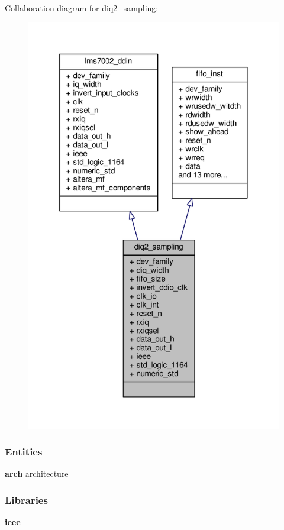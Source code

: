 Collaboration diagram for diq2\+\_\+sampling\+:\nopagebreak
\begin{figure}[H]
\begin{center}
\leavevmode
\includegraphics[width=320pt]{d4/d94/classdiq2__sampling__coll__graph}
\end{center}
\end{figure}
\subsubsection*{Entities}
\begin{DoxyCompactItemize}
\item 
{\bf arch} architecture
\end{DoxyCompactItemize}
\subsubsection*{Libraries}
 \begin{DoxyCompactItemize}
\item 
{\bf ieee} 
\end{DoxyCompactItemize}

